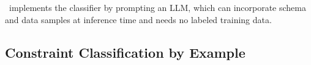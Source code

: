 

    
\system\ implements the classifier by prompting an LLM, which can incorporate schema and data samples at inference time and needs no labeled training data.

\subsection*{Constraint Classification by Example}


